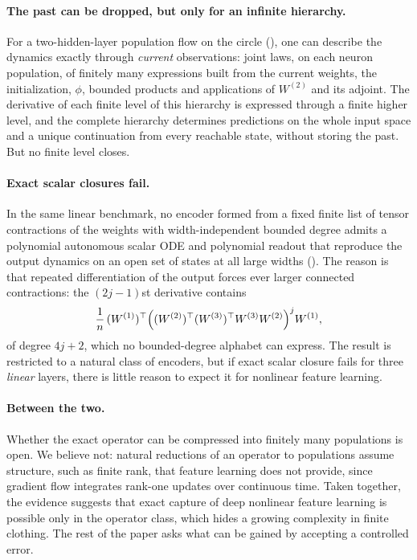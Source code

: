 \documentclass[11pt]{article}
\theoremstyle{definition}
\theoremstyle{remark}
\begin{document}
\paragraph{The past can be dropped, but only for an infinite hierarchy.}
For a two-hidden-layer population flow on the circle (), one can
describe the dynamics exactly through \emph{current} observations: joint laws,
on each neuron population, of finitely many expressions built from the current
weights, the initialization, $\phi$, bounded products and applications of
$W^{(2)}$ and its adjoint.  The derivative of each finite level of this
hierarchy is expressed through a finite higher level, and the complete hierarchy
determines predictions on the whole input space and a unique continuation from
every reachable state, without storing the past.  But no finite level closes.

\paragraph{Exact scalar closures fail.}
In the same linear benchmark, no encoder formed from a fixed finite list of
tensor contractions of the weights with width-independent bounded degree admits
a polynomial autonomous scalar ODE and polynomial readout that reproduce the
output dynamics on an open set of states at all large widths ().
The reason is that repeated differentiation of the output forces ever larger
connected contractions: the $(2j-1)$st derivative contains
\[
 \frac1n\,(W^{(1)})^\top\Bigl((W^{(2)})^\top(W^{(3)})^\top W^{(3)}W^{(2)}\Bigr)^{j}W^{(1)},
\]
of degree $4j+2$, which no bounded-degree alphabet can express.  The result is
restricted to a natural class of encoders, but if exact scalar closure fails for
three \emph{linear} layers, there is little reason to expect it for nonlinear
feature learning.

\paragraph{Between the two.}
Whether the exact operator can be compressed into finitely many populations is
open.  We believe not: natural reductions of an operator to populations assume
structure, such as finite rank, that feature learning does not provide, since
gradient flow integrates rank-one updates over continuous time.  Taken together,
the evidence suggests that exact capture of deep nonlinear feature learning is
possible only in the operator class, which hides a growing complexity in finite
clothing.  The rest of the paper asks what can be gained by accepting a
controlled error.
\end{document}
